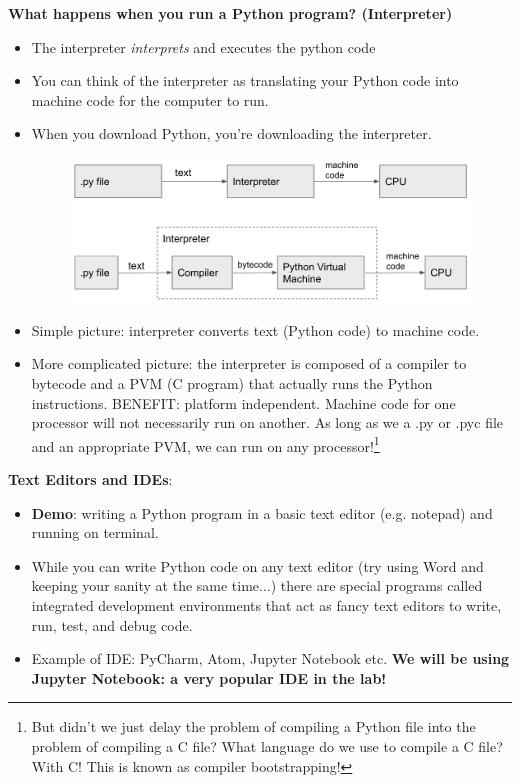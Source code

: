 \documentclass[12pt]{article}
\numberwithin{equation}{section}
\begin{document}
\textbf{What happens when you run a Python program? (Interpreter)}
\begin{itemize}
    \item The interpreter \textit{interprets} and executes the python code
    \item You can think of the interpreter as translating your Python code into machine code for the computer to run.
    \item When you download Python, you're downloading the interpreter.
    
    \begin{figure}[H]
    	\centering
    	\includegraphics[width=13cm] {py}
    \end{figure}

	\item Simple picture: interpreter converts text (Python code) to machine code.
	\item More complicated picture: the interpreter is composed of a compiler to bytecode and a PVM (C program) that actually runs the Python instructions. BENEFIT: platform independent. Machine code for one processor will not necessarily run on another. As long as we a .py or .pyc file and an appropriate PVM, we can run on any processor!\footnote{But didn't we just delay the problem of compiling a Python file into the problem of compiling a C file? What language do we use to compile a C file? With C! This is known as compiler bootstrapping!}


\end{itemize}

\textbf{Text Editors and IDEs}:
\begin{itemize}
    \item \textbf{Demo}: writing a Python program in a basic text editor (e.g. notepad) and running on terminal.
    \item While you can write Python code on any text editor (try using Word and keeping your sanity at the same time...) there are special programs called integrated development environments that act as fancy text editors to write, run, test, and debug code.
    \item Example of IDE: PyCharm, Atom, Jupyter Notebook etc. \textbf{We will be using Jupyter Notebook: a very popular IDE in the lab!}
\end{itemize}
\end{document}
